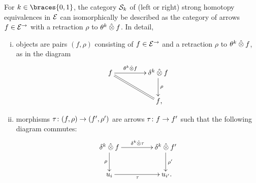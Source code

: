 \documentclass[reqno,10pt,a4paper,oneside,draft]{amsart}
\begin{document}
\begin{lemma} \label{strong-h-equiv-as-section}
For $k \in \braces{0, 1}$, the category $\cal{S}_k$ of (left or right) strong homotopy equivalences in $\catE$ can isomorphically be described as the category of arrows $f \in \catE^{\to}$ with a retraction $\rho$ to $\thetak \hatotimes f$.
In detail,
\begin{enumerate}[(i)]
\item objects are pairs $(f, \rho)$ consisting of $f \in \catE^\to$ and a retraction $\rho$ to $\thetak \hatotimes f$, as in the diagram
\[
\xymatrix@C+2em{
  f
  \ar[r]^-{\thetak \hatotimes f}
  \ar@{=}[dr]
&
  \kcyl \hatotimes f \ar[d]^{\rho}
\\&
  f
\rlap{,}}
\]
\item morphisms $\tau \co (f, \rho) \to (f', \rho')$ are arrows $\tau \co f \to f'$ such that the following diagram commutes:
\[
\xymatrix@C+2em{
  \kcyl \hatotimes f
  \ar[d]_-{\rho}
  \ar[r]^{\kcyl \hatotimes \tau}
&
 \kcyl \hatotimes f'
  \ar[d]^-{\rho'}
\\
  u_i
  \ar[r]_{\tau}
&
  u_{i'} \rlap{.}
}
\]
\end{enumerate}
\end{lemma}
\end{document}
